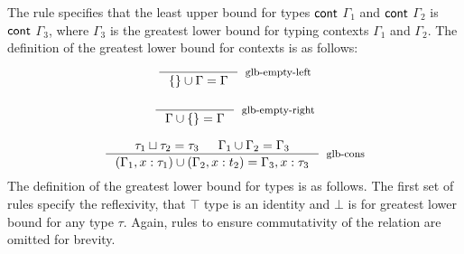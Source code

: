 \documentclass[review]{elsarticle}
\theoremstyle{definition}
\newcommand{\Con}[1]{\red{\mathsf{#1}}}
\begin{document}
The rule specifies that the least upper bound for types \ensuremath{\Con{cont}} $\Gamma_1$ and \ensuremath{\Con{cont}} $\Gamma_2$ is
\ensuremath{\Con{cont}} $\Gamma_3$, where $\Gamma_3$ is the greatest lower bound for typing contexts $\Gamma_1$ and $\Gamma_2$.
The definition of the greatest lower bound for contexts is as follows:
\[
  \begin{array}{c}
    \inference{}{\{\} \cup \Gamma = \Gamma}[glb-empty-left] \\ \\
    \inference{}{\Gamma \cup \{\} = \Gamma}[glb-empty-right] \\ \\
      \inference{\tau_1 \sqcup \tau_2 = \tau_3 & \Gamma_1 \cup \Gamma_2 = \Gamma_3}
                {(\Gamma_1 , x : \tau_1) \cup (\Gamma_2 , x : t_2) = \Gamma_3, x : \tau_3}
                [glb-cons]
  \end{array}
\]
The definition of the greatest lower bound for types is as follows. The first set of rules specify the reflexivity,
that $\top$ type is an identity and $\bot$ is for greatest lower bound for any type $\tau$.
Again, rules to ensure commutativity of the relation are omitted for brevity.
\end{document}
